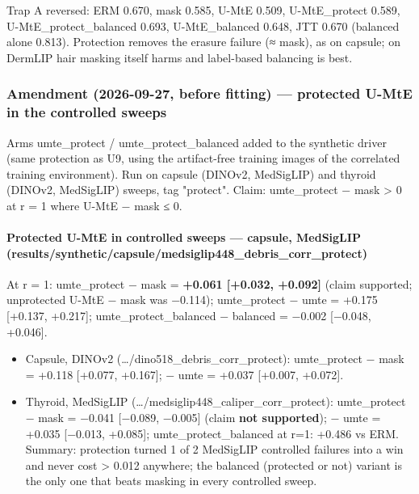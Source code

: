 {Trap A reversed: ERM 0.670, mask 0.585, U-MtE 0.509, U-MtE\_protect 0.589, U-MtE\_protect\_balanced 0.693,
U-MtE\_balanced 0.648, JTT 0.670 (balanced alone 0.813). Protection removes the erasure failure (≈ mask), as on
capsule; on DermLIP hair masking itself harms and label-based balancing is best.

\subsubsection{Amendment (2026-09-27, before fitting) --- protected U-MtE in the controlled sweeps}\label{amendment-2026-09-27-before-fitting--protected-u-mte-in-the-controlled-sweeps}

Arms umte\_protect / umte\_protect\_balanced added to the synthetic driver (same protection as U9, using the
artifact-free training images of the correlated training environment). Run on capsule (DINOv2, MedSigLIP) and
thyroid (DINOv2, MedSigLIP) sweeps, tag "protect". Claim: umte\_protect − mask \textgreater{} 0 at r = 1 where U-MtE − mask ≤ 0.

\paragraph{Protected U-MtE in controlled sweeps --- capsule, MedSigLIP (results/synthetic/capsule/medsiglip448\_debris\_corr\_protect)}\label{protected-u-mte-in-controlled-sweeps--capsule-medsiglip-resultssyntheticcapsulemedsiglip448_debris_corr_protect}

At r = 1: umte\_protect − mask = \textbf{+0.061 {[}+0.032, +0.092{]}} (claim supported; unprotected U-MtE − mask was −0.114);
umte\_protect − umte = +0.175 {[}+0.137, +0.217{]}; umte\_protect\_balanced − balanced = −0.002 {[}−0.048, +0.046{]}.

\begin{itemize}

\item
  Capsule, DINOv2 (\ldots/dino518\_debris\_corr\_protect): umte\_protect − mask = +0.118 {[}+0.077, +0.167{]}; − umte = +0.037
  {[}+0.007, +0.072{]}.
\item
  Thyroid, MedSigLIP (\ldots/medsiglip448\_caliper\_corr\_protect): umte\_protect − mask = −0.041 {[}−0.089, −0.005{]}
  (claim \textbf{not supported}); − umte = +0.035 {[}−0.013, +0.085{]}; umte\_protect\_balanced at r=1: +0.486 vs ERM.
  Summary: protection turned 1 of 2 MedSigLIP controlled failures into a win and never cost \textgreater{} 0.012 anywhere; the
  balanced (protected or not) variant is the only one that beats masking in every controlled sweep.
\end{itemize}

}
